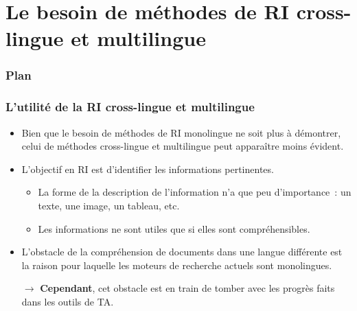 \documentclass[12pt,aspectratio=43,dvipsnames,table]{beamer}
\begin{document}
\section{Le besoin de méthodes de RI cross-lingue et multilingue}


\begin{frame}
\frametitle{Plan}
\tableofcontents[sectionstyle=show,subsectionstyle=hide,subsubsectionstyle=hide]
\end{frame}


\begin{frame}
    \frametitle{L'utilité de la RI cross-lingue et multilingue}
    \begin{itemize} \itemsep10pt
        \item Bien que le besoin de méthodes de RI monolingue ne soit plus à 
              démontrer, celui de méthodes cross-lingue et multilingue 
              peut apparaître moins évident.
        \item L'objectif en RI est d'identifier les informations pertinentes.
        \begin{itemize}
            \item La forme de la description de l'information n'a que peu
                  d'importance~: un texte, une image, un tableau, etc.
            \item Les informations ne sont utiles que si elles sont 
                  compréhensibles.
        \end{itemize}
        \item L'obstacle de la compréhension de documents dans une langue 
              différente est la raison pour laquelle les moteurs de recherche 
              actuels sont monolingues.
        \item[$\to$] \textbf{Cependant}, cet obstacle est en train de tomber 
                     avec les progrès faits dans les outils de TA.
    \end{itemize}
\end{frame}
\end{document}
